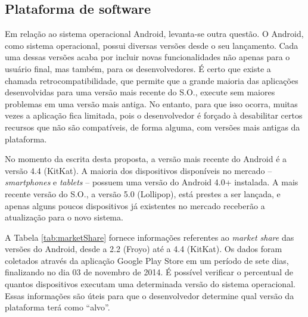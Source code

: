 \subsection{Plataforma de software}

Em relação ao sistema operacional Android, levanta-se outra questão. O Android, como sistema operacional, possui diversas versões desde o seu lançamento. Cada uma dessas versões acaba por incluir novas funcionalidades não apenas para o usuário final, mas também, para os desenvolvedores. É certo que existe a chamada retrocompatibilidade, que permite que a grande maioria das aplicações desenvolvidas para uma versão mais recente do S.O., execute sem maiores problemas em uma versão mais antiga. No entanto, para que isso ocorra, muitas vezes a aplicação fica limitada, pois o desenvolvedor é forçado à desabilitar certos recursos que não são compatíveis, de forma alguma, com versões mais antigas da plataforma.

No momento da escrita desta proposta, a versão mais recente do Android é a versão 4.4 (KitKat). A maioria dos dispositivos disponíveis no mercado -- \emph{smartphones} e \emph{tablets} -- possuem uma versão do Android 4.0+ instalada. A mais recente versão do S.O., a versão 5.0 (Lollipop), está prestes a ser lançada, e apenas alguns poucos dispositivos já existentes no mercado receberão a atualização para o novo sistema.

A Tabela \ref{tab:marketShare} fornece informações referentes ao \emph{market share} das versões do Android, desde a 2.2 (Froyo) até a 4.4 (KitKat). Os dados foram coletados através da aplicação Google Play Store em um período de sete dias, finalizando no dia 03 de novembro de 2014. É possível verificar o percentual de quantos dispositivos executam uma determinada versão do sistema operacional. Essas informações são úteis para que o desenvolvedor determine qual versão da plataforma terá como ``alvo''.

